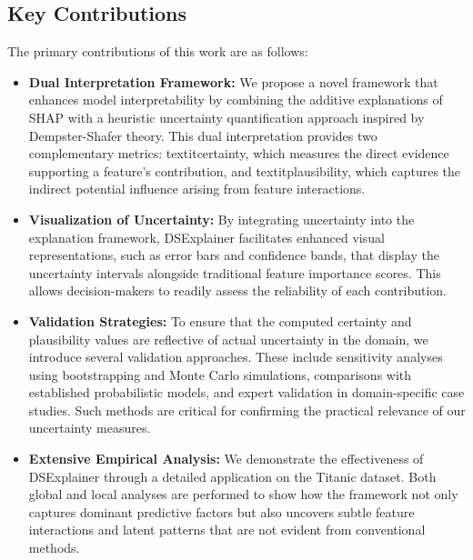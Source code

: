 \documentclass[acmlarge]{acmart}
\begin{document}
\subsection{Key Contributions}
The primary contributions of this work are as follows:
\begin{itemize}
    \item \textbf{Dual Interpretation Framework:} We propose a novel framework that enhances model interpretability by combining the additive explanations of SHAP with a heuristic uncertainty quantification approach inspired by Dempster-Shafer theory. This dual interpretation provides two complementary metrics: textit{certainty}, which measures the direct evidence supporting a feature's contribution, and textit{plausibility}, which captures the indirect potential influence arising from feature interactions.

    \item \textbf{Visualization of Uncertainty:} By integrating uncertainty into the explanation framework, DSExplainer facilitates enhanced visual representations, such as error bars and confidence bands, that display the uncertainty intervals alongside traditional feature importance scores. This allows decision-makers to readily assess the reliability of each contribution.
    \item \textbf{Validation Strategies:} To ensure that the computed certainty and plausibility values are reflective of actual uncertainty in the domain, we introduce several validation approaches. These include sensitivity analyses using bootstrapping and Monte Carlo simulations, comparisons with established probabilistic models, and expert validation in domain-specific case studies. Such methods are critical for confirming the practical relevance of our uncertainty measures.
    \item \textbf{Extensive Empirical Analysis:} We demonstrate the effectiveness of DSExplainer through a detailed application on the Titanic dataset. Both global and local analyses are performed to show how the framework not only captures dominant predictive factors but also uncovers subtle feature interactions and latent patterns that are not evident from conventional methods.
\end{itemize}
\end{document}
